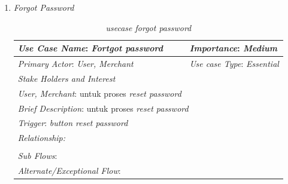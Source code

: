 \documentclass[a4paper]{article}
\begin{document}
\begin{enumerate}
\begin{enumerate}
        \item \textit{Forgot Password}
\begin{table}[h]
    \centering
    \caption{\textit{usecase forgot password} }
    \begin{tabular}{|lll}
    \hline
    \multicolumn{1}{|l|}{\textit{Use Case Name}: \textit{Fortgot password}}             & \multicolumn{2}{l|}{\textit{Importance}: \textit{Medium}}   \\ \hline
    \multicolumn{1}{|l|}{\textit{Primary Actor}: \textit{User, Merchant}}             & \multicolumn{2}{l|}{\textit{Use case Type}: \textit{Essential}} \\ \hline
    \multicolumn{1}{|l|}{\textit{Stake Holders and Interest}} &                               &                               \\ \cline{1-1}
    \multicolumn{1}{|l|}{\textit{User, Merchant}: untuk proses \textit{reset password}}                                                     &                               &                               \\ \hline
    \multicolumn{3}{|l|}{\textit{Brief Description}: untuk proses \textit{reset password}}                                                                         \\ \hline
    \multicolumn{3}{|l|}{\textit{Trigger}: \textit{button reset password}}                                                                                   \\ \hline
    \multicolumn{3}{|l|}{\textit{Relationship:}}                                                                              \\ \hline
    \multicolumn{3}{|l|}{}                                                                                                                     \\ \hline
    \multicolumn{3}{|l|}{\textit{Sub Flows}:}                                                                                 \\ \hline
    \multicolumn{3}{|l|}{\textit{Alternate/Exceptional Flow}:}                                                                \\ \hline
    \end{tabular}
\end{table}

        \newpage


\end{enumerate}
\end{enumerate}
\end{document}
